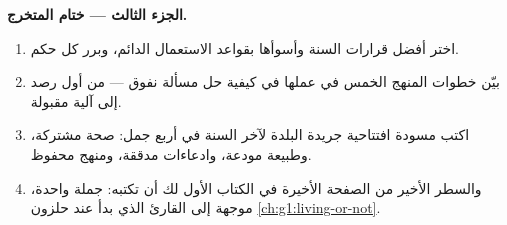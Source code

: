 \begin{problem}
\medskip\noindent\textbf{الجزء الثالث --- ختام
المتخرج.}
\begin{enumerate}[resume]
  \item اختر أفضل قرارات السنة وأسوأها بقواعد الاستعمال
        الدائم، وبرر كل حكم.
  \item بيّن خطوات المنهج الخمس في عملها في كيفية حل
        مسألة نفوق  --- من أول رصد إلى آلية
        مقبولة.
  \item اكتب مسودة افتتاحية جريدة البلدة لآخر السنة في
        أربع جمل: صحة مشتركة، وطبيعة مودعة، وادعاءات
        مدققة، ومنهج محفوظ.
  \item والسطر الأخير من الصفحة الأخيرة في الكتاب الأول
        لك أن تكتبه: جملة واحدة، موجهة إلى القارئ الذي
        بدأ عند حلزون \cref{ch:g1:living-or-not}.
\end{enumerate}
\end{problem}
